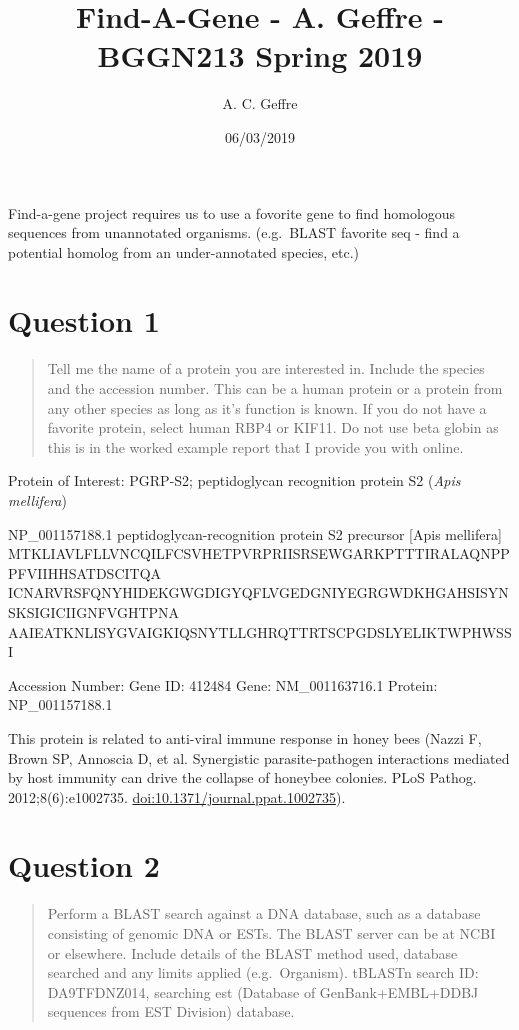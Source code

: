 \documentclass[]{article}
\title{Find-A-Gene - A. Geffre - BGGN213 Spring 2019}
\author{A. C. Geffre}
\date{06/03/2019}
\begin{document}
\maketitle

Find-a-gene project requires us to use a fovorite gene to find
homologous sequences from unannotated organisms. (e.g.~BLAST favorite
seq - find a potential homolog from an under-annotated species, etc.)

\section{Question 1}\label{question-1}

\begin{quote}
Tell me the name of a protein you are interested in. Include the species
and the accession number. This can be a human protein or a protein from
any other species as long as it's function is known. If you do not have
a favorite protein, select human RBP4 or KIF11. Do not use beta globin
as this is in the worked example report that I provide you with online.
\end{quote}

Protein of Interest: PGRP-S2; peptidoglycan recognition protein S2
(\emph{Apis mellifera})

NP\_001157188.1 peptidoglycan-recognition protein S2 precursor {[}Apis
mellifera{]}
MTKLIAVLFLLVNCQILFCSVHETPVRPRIISRSEWGARKPTTTIRALAQNPPPFVIIHHSATDSCITQA
ICNARVRSFQNYHIDEKGWGDIGYQFLVGEDGNIYEGRGWDKHGAHSISYNSKSIGICIIGNFVGHTPNA
AAIEATKNLISYGVAIGKIQSNYTLLGHRQTTRTSCPGDSLYELIKTWPHWSSI

Accession Number: Gene ID: 412484 Gene: NM\_001163716.1 Protein:
NP\_001157188.1

This protein is related to anti-viral immune response in honey bees
(Nazzi F, Brown SP, Annoscia D, et al. Synergistic parasite-pathogen
interactions mediated by host immunity can drive the collapse of
honeybee colonies. PLoS Pathog. 2012;8(6):e1002735.
\url{doi:10.1371/journal.ppat.1002735}).

\section{Question 2}\label{question-2}

\begin{quote}
Perform a BLAST search against a DNA database, such as a database
consisting of genomic DNA or ESTs. The BLAST server can be at NCBI or
elsewhere. Include details of the BLAST method used, database searched
and any limits applied (e.g.~Organism). tBLASTn search ID: DA9TFDNZ014,
searching est (Database of GenBank+EMBL+DDBJ sequences from EST
Division) database.
\end{quote}
\end{document}
